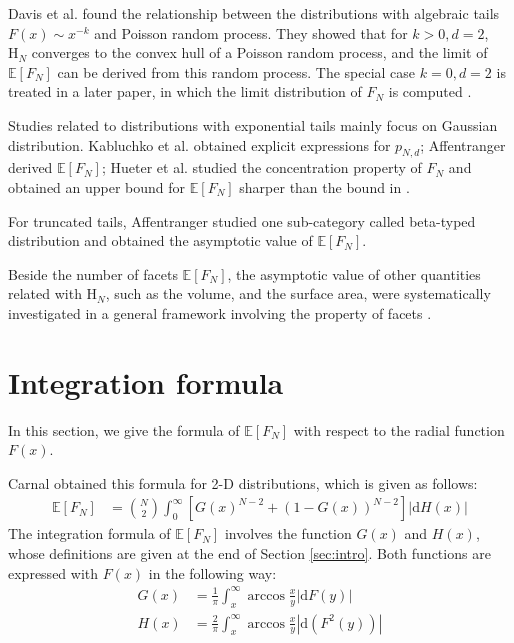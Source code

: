\documentclass{aptpub}
\def\E{\mathbb{E}}
\begin{document}
Davis et al. \cite{davis1987convex} found the relationship between the distributions with algebraic tails $F(x) \sim x^{-k}$ and Poisson random process.
They showed that for $k>0, d=2$,
$\mathrm{H}_N$ converges to the convex hull of a Poisson random process,
and
the limit of $\E[F_N]$ can be derived from this random process.
The special case $k=0, d=2$ is treated in a later paper, in which the
limit distribution of $F_N$ is computed \cite{aldous1991number}.

Studies related to distributions with exponential tails mainly focus on Gaussian distribution.
Kabluchko et al. \cite{kabluchko2020absorption} obtained explicit expressions for $p_{N,d}$;
Affentranger \cite{affentranger1991convex} derived $\E[F_N]$;
Hueter et al. \cite{hueter1999limit} studied the concentration property of $F_N$ and obtained
an upper bound for $\E[F_N]$ sharper than the bound in \cite{dwyer1991convex}.

For truncated tails,
Affentranger \cite{affentranger1991convex} studied one sub-category called beta-typed distribution and obtained
the asymptotic value of $\E[F_N]$.

Beside the number of facets $\E[F_N]$,
the asymptotic value of other quantities related with $\mathrm{H}_N$, such as the volume, and the surface area,
were systematically investigated in a general framework involving the property of facets
\cite{schneider2008stochastic, barany2008random}.

 \section{Integration formula}\label{sec:int_f}
In this section, we give the formula of $\E[F_N]$ with respect to the radial function $F(x)$.

Carnal \cite{carnal1970konvexe}
obtained
this formula for 2-D distributions,
which is given as follows:
\begin{align}
     \E[F_N] &= \binom{N}{2} \int_0^{\infty} 
     \left[G(x)^{N-2} + (1-G(x))^{N-2} \right]|\mathrm{d} H(x)| 
     \label{eq:E_F_N_2_d}
\end{align}
The integration formula of $\E[F_N]$ involves the function $G(x)$ and $H(x)$,
whose definitions are given at the end of Section \ref{sec:intro}.
Both functions are expressed with $F(x)$ in the following way:
\begin{align}
   G(x) &=\frac{1}{\pi} \int_x^{\infty}\arccos\frac{x}{y} |\mathrm{d} F(y)| \\
     H(x) &= \frac{2}{\pi} \int_x^{\infty} \arccos \frac{x}{y} |\mathrm{d}(F^2(y))|
     \label{eq:H_expression_2_dim}
\end{align}
\end{document}
